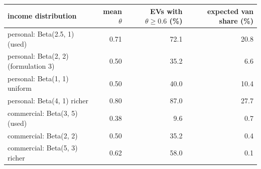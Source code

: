 \begin{tabular}{lrrr}\toprule
income distribution & mean $\theta$ & EVs with $\theta\ge0.6$ (\%) & expected van share (\%) \\ \midrule
personal: Beta(2.5, 1) (used) & 0.71 & 72.1 & 20.8 \\
personal: Beta(2, 2) (formulation 3) & 0.50 & 35.2 & 6.6 \\
personal: Beta(1, 1) uniform & 0.50 & 40.0 & 10.4 \\
personal: Beta(4, 1) richer & 0.80 & 87.0 & 27.7 \\
commercial: Beta(3, 5) (used) & 0.38 & 9.6 & 0.7 \\
commercial: Beta(2, 2) & 0.50 & 35.2 & 0.4 \\
commercial: Beta(5, 3) richer & 0.62 & 58.0 & 0.1 \\
\bottomrule\end{tabular}

